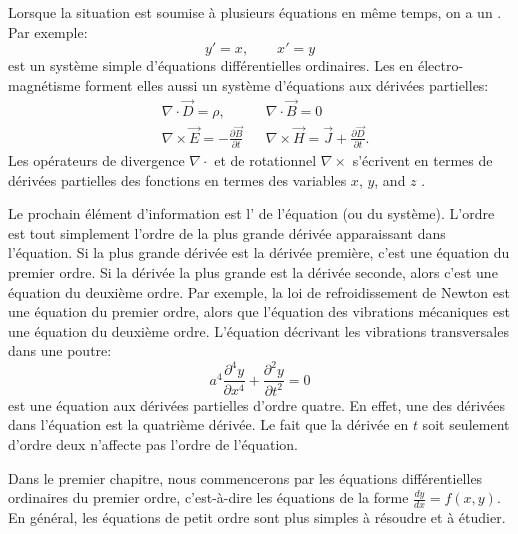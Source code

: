 Lorsque la situation est soumise à plusieurs équations en même temps, on a un
\emph{}.  
Par exemple: 
\begin{equation*}
	y' = x , \qquad x' = y
\end{equation*}
est un système simple d'équations différentielles ordinaires.
Les  en électro-magnétisme forment elles aussi un système d'équations aux dérivées partielles:
\begin{align*}
	& \nabla \cdot \vec{D} = \rho, & & \nabla \cdot \vec{B} = 0  \\
	& \nabla \times \vec{E} = - \frac{\partial \vec{B}}{\partial t} &
	& \nabla \times \vec{H} = \vec{J} + \frac{\partial \vec{D}}{\partial t} .
\end{align*}
Les opérateurs de divergence $\nabla \cdot$ et de rotationnel $\nabla \times$ s'écrivent en termes de dérivées partielles des fonctions en termes des variables $x$, $y$, and $z$ .

\medskip

Le prochain élément d'information est l'\emph{} de l'équation (ou du système).   L'ordre est tout simplement l'ordre de la plus grande dérivée apparaissant dans l'équation.  Si la plus grande dérivée est la dérivée première, c'est une équation du premier ordre.  Si la dérivée la plus grande est la dérivée seconde, alors c'est une équation du deuxième ordre.  Par exemple, la loi de refroidissement de Newton est une équation du premier ordre, alors que l'équation des vibrations mécaniques est une équation du deuxième ordre.  L'équation décrivant les vibrations transversales dans une poutre: 
\begin{equation*}
	a^4 \frac{\partial^4 y}{\partial x^4} + \frac{\partial^2 y}{\partial t^2} = 0
\end{equation*}
est une équation aux dérivées partielles d'ordre quatre.  En effet, une des dérivées dans l'équation est la quatrième dérivée.  Le fait que la dérivée en $t$ soit seulement d'ordre deux n'affecte pas l'ordre de l'équation.

Dans le premier chapitre, nous commencerons par les équations différentielles ordinaires du premier ordre, c'est-à-dire les équations de la forme $\frac{dy}{dx} = f(x,y)$.  En général, les équations de petit ordre sont plus simples à résoudre et à étudier.

\medskip

